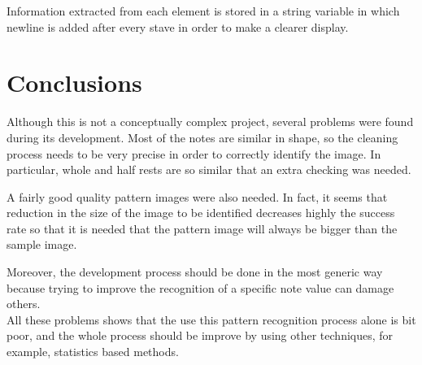 \documentclass[10pt, a4paper]{article}
\begin{document}
Information extracted from each element is stored in a string variable in which newline is added after every stave in order to make a clearer display.

\section{Conclusions}

Although this is not a conceptually complex project, several problems were found during its development. Most of the notes are similar in shape, so the cleaning process needs to be very precise in order to correctly identify the image. In particular, whole and half rests are so similar that an extra checking was needed.


A fairly good quality pattern images were also needed. In fact, it seems that reduction in the size of the image to be identified decreases highly the success rate so that it is needed that the pattern image will always be bigger than the sample image.

Moreover, the development process should be done in the most generic way because trying to improve the recognition of a specific note value can damage others.\\ 

All these problems shows that the use this pattern recognition process alone is bit poor, and the whole process should be improve by using other techniques, for example, statistics based methods.
\end{document}
